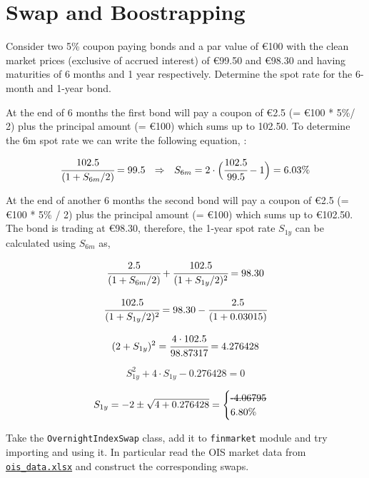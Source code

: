 \chapter{Swap and Boostrapping}\label{introduction-to-python---lesson-7}

\begin{Exercise}[title={(Analytic bootstrapping)}]
Consider two 5\% coupon paying bonds and a par value of \euro{100} with the clean market prices (exclusive of accrued interest) of \euro{99.50} and \euro{98.30} and having maturities of 6 months and 1 year respectively.
Determine the spot rate for the 6-month and 1-year bond.  
\end{Exercise}

\begin{Answer}
At the end of 6 months the first bond will pay a coupon of \euro{2.5} (= \euro{100} * 5\%/ 2) plus the principal amount (= €100) which sums up to 102.50. To
determine the 6m spot rate we can write the following equation, :

\[ \cfrac{102.5}{(1 + S_{6m}/2)} = 99.5~~\Rightarrow~~ S_{6m} = 2 \cdot \Big( \cfrac{102.5}{99.5} - 1 \Big) =  6.03 \%\]

At the end of another 6 months the second bond will pay a coupon of €2.5
(= €100 * 5\% / 2) plus the principal amount (= €100) which sums up to
€102.50. The bond is trading at €98.30, therefore, the 1-year spot rate
\(S_{1y}\) can be calculated using \(S_{6m}\) as,

\[ \cfrac{2.5}{(1+S_{6m}/2)} + \cfrac{102.5}{(1 + S_{1y}/2)^{2}} = 98.30 \]

\[ \cfrac{102.5}{(1 + S_{1y}/2)^{2}} = 98.30 - \cfrac{2.5}{(1+0.03015)} \]

\[ (2 + S_{1y})^{2} = \cfrac{4\cdot102.5}{98.87317} = 4.276428 \]

\[ S_{1y}^{2} + 4\cdot S_{1y} - 0.276428 = 0 \]

\[ S_{1y} = -2 \pm \sqrt{4 + 0.276428} =\begin{cases}\text{\sout{-4.06795}} \\ 6.80\%\end{cases} \]

\end{Answer}

\begin{Exercise}
Take the \texttt{OvernightIndexSwap} class, add it to \texttt{finmarket} module and try importing and using it. In particular read the OIS market data from \href{https://drive.google.com/file/d/1LCEDmheKqwPXFpJ25hFz32QI5im2UJO1/view?usp=sharing}{\texttt{ois\_data.xlsx}} and construct the corresponding swaps.
\end{Exercise}

